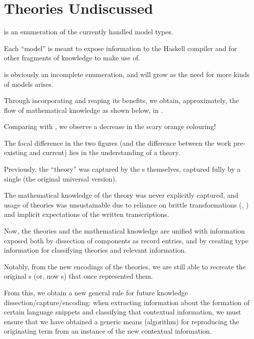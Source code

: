 
\section{Theories Undiscussed}

\ModelKinds{} is an enumeration of the currently handled model types.

Each ``model'' is meant to expose information to the Haskell compiler and for
other fragments of knowledge to make use of.

\ModelKinds{} is obviously an incomplete enumeration, and will grow as the need
for more kinds of models arises.

Through incorporating \ModelKinds{} and reaping its benefits, we obtain,
approximately, the flow of mathematical knowledge as shown below, in
.

\theoriesWithModelKinds{}

Comparing  with , we
observe a decrease in the scary orange colouring!

The focal difference in the two figures (and the difference between the work
pre-existing and current) lies in the understanding of a theory.

Previously, the ``theory'' was captured by the \RelationConcept{}s themselves,
captured fully by a single \Expr{} (the original universal version).

The mathematical knowledge of the theory was never explicitly captured, and
usage of theories was unsustainable due to reliance on brittle transformations
(\relToQD{}, ) and implicit expectations of the
written transcriptions.

Now, the theories and the mathematical knowledge are unified with information
exposed both by dissection of components as record entries, and by creating type
information for classifying theories and relevant information.

Notably, from the new encodings of the theories, we are still able to recreate
the original \Expr{}s (or, now \ModelExpr{}s) that once represented them.

\theoriesSideBySideModelKinds{}


From this, we obtain a new general rule for future knowledge
dissection/capture/encoding: when extracting information about the formation of
certain language snippets and classifying that contextual information, we must
ensure that we have obtained a generic means (algorithm) for reproducing the
originating term from an instance of the new contextual information.

